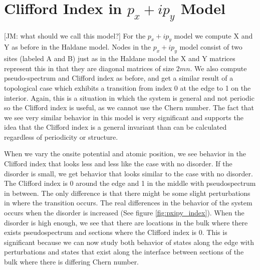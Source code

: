 \documentclass[a4paper]{article}
\newcommand{\jm}[1]{{\color{red} [JM: #1]}}
\begin{document}
\section{Clifford Index in \texorpdfstring{$p_x + ip_y$}{px + ipy} Model}
\jm{what should we call this model?}
For the $p_x + ip_y$ model we compute X and Y as before in the Haldane model.
Nodes in the $p_x + ip_y$ model consist of two sites (labeled A and B) just as in the Haldane model the X and Y matrices represent this in that they are diagonal matrices of size $2mn$.
We also compute pseudo-spectrum and Clifford index as before, and get a similar result of a topological case which exhibits a transition from index 0 at the edge to 1 on the interior.
Again, this is a situation in which the system is general and not periodic so the Clifford index is useful, as we cannot use the Chern number.
The fact that we see very similar behavior in this model is very significant and supports the idea that the Clifford index is a general invariant than can be calculated regardless of periodicity or structure.

When we vary the onsite potential and atomic position, we see behavior in the Clifford index that looks less and less like the case with no disorder.
If the disorder is small, we get behavior that looks similar to the case with no disorder.
The Clifford index is 0 around the edge and 1 in the middle with pseudospectrum in between.
The only difference is that there might be some slight perturbations in where the transition occurs.
The real differences in the behavior of the system occurs when the disorder is increased (See figure \ref{fig:pxipy_index}).
When the disorder is high enough, we see that there are locations in the bulk where there exists pseudospectrum and sections where the Clifford index is 0.
This is significant because we can now study both behavior of states along the edge with perturbations and states that exist along the interface between sections of the bulk where there is differing Chern number.
\end{document}
